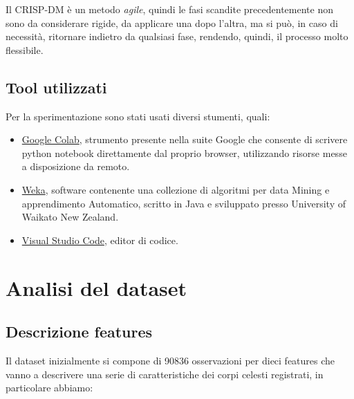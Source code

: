 \documentclass[italian,12pt,a4paper]{article}
\begin{document}
	Il CRISP-DM è un metodo \textit{agile}, quindi le fasi scandite precedentemente non sono da considerare rigide, da applicare una dopo l'altra, ma si può, in caso di necessità, ritornare indietro da qualsiasi fase, rendendo, quindi, il processo molto flessibile.
	
	\subsection{Tool utilizzati}
	Per la sperimentazione sono stati usati diversi stumenti, quali:
	
		\begin{itemize}
			\item \href{https://colab.research.google.com/}{Google Colab}, strumento  presente nella suite Google che consente di scrivere python notebook direttamente dal proprio browser, utilizzando risorse messe a disposizione da remoto. 
			\item \href{https://www.cs.waikato.ac.nz/~ml/weka/}{Weka}, software contenente una collezione di algoritmi per data Mining e apprendimento Automatico, scritto in Java e sviluppato presso University of Waikato New Zealand.
			\item \href{https://code.visualstudio.com/}{Visual Studio Code}, editor di codice.
		\end{itemize}


	\section{Analisi del dataset}
	
	\subsection{Descrizione features}
	Il dataset inizialmente si compone di 90836 osservazioni per dieci features che vanno a descrivere una serie di caratteristiche dei corpi celesti registrati, in particolare abbiamo:
	
\end{document}
